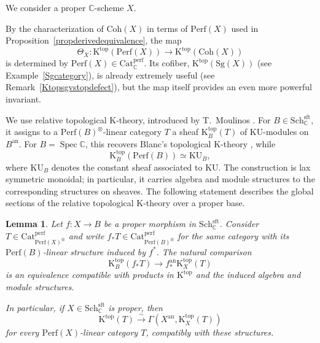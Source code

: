 \documentclass{amsart}
\theoremstyle{plain}
\newtheorem{lemma}[prop]{Lemma}
\theoremstyle{definition}
\newcommand{\bbC}{\mathbb{C}}
\newcommand{\Catperf}{\mathrm{Cat}^{\mathrm{perf}}}
\newcommand{\Perf}{\mathrm{Perf}}
\newcommand{\K}{\mathrm{K}}
\newcommand{\KU}{\mathrm{KU}}
\newcommand{\Coh}{\mathrm{Coh}}
\newcommand{\Sg}{\mathrm{Sg}}
\newcommand{\Sch}{\mathrm{Sch}}
\DeclareMathOperator{\Spec}{Spec}
\newcommand{\an}{\mathrm{an}}
\newcommand{\sft}{\mathrm{sft}}
\begin{document}
We consider a proper $\bbC$-scheme $X$.

By the characterization of $\Coh(X)$ in terms of $\Perf(X)$ used in Proposition~\ref{propderivedequivalence}, the map
\begin{equation}\label{eqTheta}
\Theta_X:\K^{\mathrm{top}}(\Perf(X))\longrightarrow
\K^{\mathrm{top}}(\Coh(X))
\end{equation}
is determined by $\Perf(X)\in \Catperf_\bbC$.
Its cofiber, $\K^{\mathrm{top}}(\Sg(X))$ (see Example~\ref{Sgcategory}), is already extremely useful (see Remark~\ref{Ktopsgvstopdefect}), but the map itself provides an even more powerful invariant.

We use relative topological $\K$-theory, introduced by T.~Moulinos \cite{Mou19}. For $B\in\Sch^\sft_\bbC$, it assigns to a $\Perf(B)^\otimes$-linear category $T$ a sheaf
$\K^{\mathrm{top}}_B(T)$ of $\KU$-modules on $B^{\an}$.
For $B=\Spec\bbC$, this recovers Blanc's topological
$\K$-theory \cite[Proposition~7.6]{Mou19}, while
\[
\K^{\mathrm{top}}_B(\Perf(B))\simeq\KU_B,
\]
where $\KU_B$ denotes the constant sheaf associated to $\KU$.
The construction is lax symmetric monoidal; in particular, it carries algebra and module structures to the corresponding structures on sheaves. The following  statement describes the global sections of the relative topological K-theory over a proper base.

\begin{lemma}\label{lemrelativeKprojective}
Let $f:X\to B$ be a proper morphism in $\Sch^\sft_\bbC$. Consider $T\in \Catperf_{\Perf(X)^\otimes}$ and write $f_*T\in\Catperf_{\Perf(B)^\otimes}$ for the same category with its
$\Perf(B)$-linear structure induced by $f^*$. The natural comparison
\[
\K^{\mathrm{top}}_B(f_*T)
\longrightarrow f^\an_*\K^{\mathrm{top}}_X(T)
\]
is an equivalence compatible with products in $\K^\mathrm{top}$ and the induced algebra and module structures.

In particular, if $X\in \Sch^\sft_\bbC$ is proper, then
\[
\K^{\mathrm{top}}(T)
\xrightarrow{\sim}
\Gamma(X^{\an},\K^{\mathrm{top}}_X(T))
\]
for every $\Perf(X)$-linear category $T$, compatibly with these structures.
\end{lemma}
\end{document}
